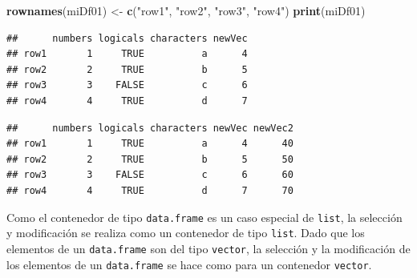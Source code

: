 \documentclass[]{book}
\newenvironment{Shaded}{\begin{snugshade}}{\end{snugshade}}
\newcommand{\KeywordTok}[1]{\textcolor[rgb]{0.13,0.29,0.53}{\textbf{#1}}}
\newcommand{\DecValTok}[1]{\textcolor[rgb]{0.00,0.00,0.81}{#1}}
\newcommand{\StringTok}[1]{\textcolor[rgb]{0.31,0.60,0.02}{#1}}
\newcommand{\OperatorTok}[1]{\textcolor[rgb]{0.81,0.36,0.00}{\textbf{#1}}}
\newcommand{\NormalTok}[1]{#1}
\begin{document}
\begin{Shaded}
\begin{Highlighting}[]
\KeywordTok{rownames}\NormalTok{(miDf01) <-}\StringTok{ }\KeywordTok{c}\NormalTok{(}\StringTok{"row1"}\NormalTok{, }\StringTok{"row2"}\NormalTok{, }\StringTok{"row3"}\NormalTok{, }\StringTok{"row4"}\NormalTok{)}
\KeywordTok{print}\NormalTok{(miDf01)}
\end{Highlighting}
\end{Shaded}

\begin{verbatim}
##      numbers logicals characters newVec
## row1       1     TRUE          a      4
## row2       2     TRUE          b      5
## row3       3    FALSE          c      6
## row4       4     TRUE          d      7
\end{verbatim}

\begin{Shaded}
\end{Shaded}

\begin{verbatim}
##      numbers logicals characters newVec newVec2
## row1       1     TRUE          a      4      40
## row2       2     TRUE          b      5      50
## row3       3    FALSE          c      6      60
## row4       4     TRUE          d      7      70
\end{verbatim}

Como el contenedor de tipo \texttt{data.frame} es un caso especial de
\texttt{list}, la selección y modificación se realiza como un contenedor
de tipo \texttt{list}. Dado que los elementos de un \texttt{data.frame}
son del tipo \texttt{vector}, la selección y la modificación de los
elementos de un \texttt{data.frame} se hace como para un contenedor
\texttt{vector}.

\begin{Shaded}
\end{Shaded}
\end{document}

